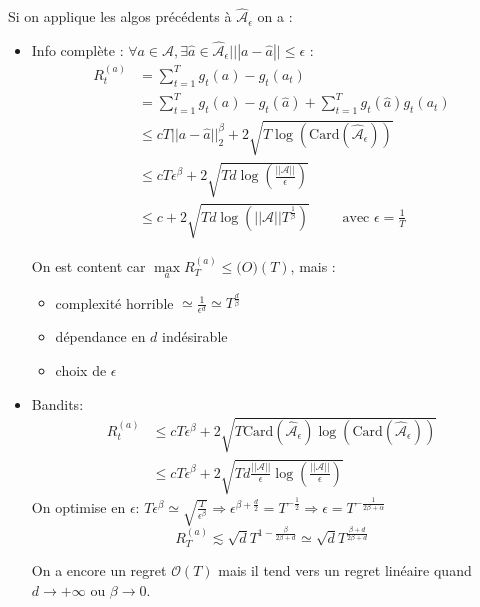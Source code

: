 \documentclass{article}
\theoremstyle{remark}
\theoremstyle{remark}
\begin{document}
Si on applique les algos précédents à $\widehat{\mathcal{A}}_\epsilon$ on a :
\begin{itemize}
   \item Info complète :
   $\forall a \in \mathcal{A},  \exists \hat{a} \in \widehat{\mathcal{A}}_\epsilon | ||a - \hat{a} || \leq \epsilon$ :
   \begin{align*}
      R_t^{(a)}
      &= \sum_{t=1}^T g_t(a) - g_t(a_t) \\
      &= \sum_{t=1}^T g_t(a) - g_t(\hat{a}) + \sum_{t=1}^T g_t(\hat{a}) g_t(a_t) \\
      &\leq c T ||a - \hat{a}||_2^\beta + 2 \sqrt{T \log(\text{Card}(\widehat{\mathcal{A}}_\epsilon))} \\
      &\leq c T \epsilon^\beta + 2 \sqrt{T d \log\left(\frac{|| \mathcal{A} ||}{\epsilon}\right)} \\
      &\leq c + 2 \sqrt{T d \log\left( ||\mathcal{A}|| T^{\frac 1 \beta} \right)}  \quad \quad \text{ avec } \epsilon = \frac 1 T
   \end{align*}

   On est content car $\max\limits_a R_T^{(a)} \leq \mathcal(O)(T)$, mais :
   \begin{itemize}
      \item complexité horrible $\simeq \frac{1}{\epsilon^d} \simeq T^{\frac d \beta}$
      \item dépendance en $d$ indésirable
      \item choix de $\epsilon$
   \end{itemize}

   \item Bandits:
   \begin{align*}
      R_t^{(a)}
      &\leq c T \epsilon^\beta + 2 \sqrt{T \text{Card}(\widehat{\mathcal{A}}_\epsilon) \log\left( \text{Card}(\widehat{\mathcal{A}}_\epsilon) \right)} \\
      &\leq c T \epsilon^\beta + 2 \sqrt{T d \frac{|| \mathcal{A} ||}{\epsilon} \log\left( \frac{|| \mathcal{A} ||}{\epsilon} \right)}
   \end{align*}
   On optimise en $\epsilon$: $T \epsilon^\beta \simeq \sqrt{\frac{T}{\epsilon^\beta}} \Rightarrow \epsilon^{\beta + \frac d 2} = T^{-\frac 1 2} \Rightarrow \epsilon = T^{-\frac{1}{2 \beta + \alpha}}$
   $$
   R_T^{(a)} \lesssim \sqrt{d} T^{1 - \frac{\beta}{2\beta + d}} \simeq \sqrt{d} T^{\frac{\beta + d}{2\beta+d}}
   $$

   On a encore un regret $\mathcal{O}(T)$ mais il tend vers un regret linéaire quand $d \rightarrow +\infty$ ou $\beta \rightarrow 0$.
\end{itemize}
\end{document}
